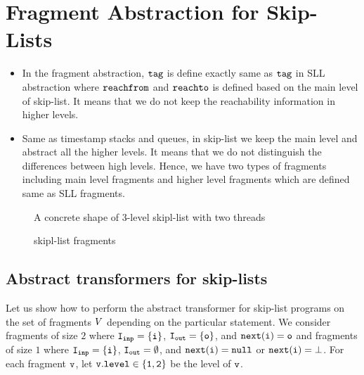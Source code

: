 \section{Fragment Abstraction for  Skip-Lists}

   \begin{itemize}
  \item In the fragment abstraction, $\tt tag$ is define exactly same as $\tt tag$ in SLL abstraction where $\mathtt{reachfrom}$ and $\mathtt{reachto}$ is defined based on the main level of skip-list. It means that we do not keep the reachability information in higher levels.
  \item Same as timestamp stacks and queues, in skip-list we keep the main level and abstract all the higher levels. It means that we do not distinguish the differences between high levels. Hence, we have two types of fragments including main level fragments and higher level fragments which are defined same as SLL fragments. 
   \end{itemize}
 \begin{figure}  
   
 \caption{A concrete shape of 3-level skipl-list with two threads}
\end{figure}

 \begin{figure}  
  
 \caption{skipl-list fragments }
\end{figure}
\subsection{Abstract transformers for skip-lists}
Let us show how to perform the abstract transformer for skip-list programs on the set of fragments $V$ depending on the particular statement.  We consider fragments of size $2$ where $\tt I_{inp} = \{i\}$, $\tt I_{out} = \{{o}\}$, and $\tt next(i) = {o}$ and fragments of size $1$ where $\tt I_{inp} = \{i\}$, $\tt I_{out} = \emptyset$, and $\tt next(i) = null$ or $\tt next(i) = \bot$. For each fragment $\tt v$, let $\tt v.level \in \{1,2\}$ be the level of $\tt v$.

